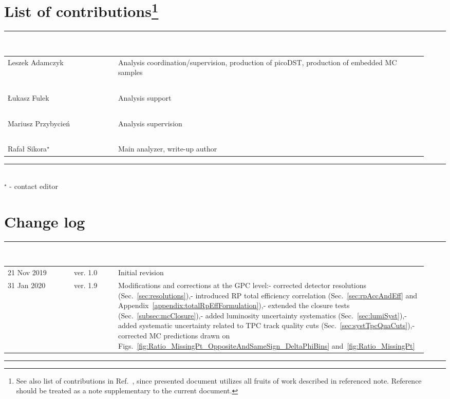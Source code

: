 \section*{\LARGE List of contributions\footnote{See also list of contributions in Ref.~\cite{supplementaryNote}, since presented document utilizes all fruits of work described in referenced note. Reference~\cite{supplementaryNote} should be treated as a note supplementary to the current document.}}%
%
   \rule{\textwidth}{1.0pt}\\[5pt]%
      \begin{tabular}{>{\raggedright}p{0.25\linewidth}p{0.7\linewidth}}
		Leszek Adamczyk & Analysis coordination/supervision, production of picoDST, production of embedded MC samples\\
		~&~\\
		Łukasz Fulek & Analysis support\\
		~&~\\
		Mariusz Przybycień & Analysis supervision\\
		~&~\\
        Rafał Sikora$^{\star}$  & Main analyzer, write-up author\\
      \end{tabular}\newline
   \rule{\textwidth}{1.0pt}\\[10pt]%
   $^{\star}$ - contact editor
   \\[50pt]%
\section*{\LARGE Change log}%
%
  \rule{\textwidth}{1.0pt}\\[5pt]%
  \begin{tabular}{>{\raggedright}p{0.15\linewidth}p{0.1\linewidth}p{0.7\linewidth}}
  	21 Nov 2019 & ver. 1.0 & Initial revision\\
  	31 Jan 2020 & ver. 1.9 & Modifications and corrections at the GPC level:\newline- corrected detector resolutions (Sec.~\ref{sec:resolutions}),\newline- introduced RP total efficiency correlation (Sec.~\ref{sec:rpAccAndEff} and Appendix~\ref{appendix:totalRpEffFormulation}),\newline- extended the closure tests (Sec.~\ref{subsec:mcClosure}),\newline- added luminosity uncertainty systematics (Sec.~\ref{sec:lumiSyst}),\newline- added systematic uncertainty related to TPC track quality cuts (Sec.~\ref{sec:systTpcQuaCuts}),\newline- corrected MC predictions drawn on Figs.~\ref{fig:Ratio_MissingPt_OppositeAndSameSign_DeltaPhiBins} and~\ref{fig:Ratio_MissingPt}
  \end{tabular}\newline%
 \rule{\textwidth}{1.0pt}

